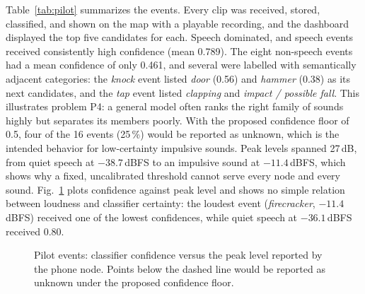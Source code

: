 \documentclass[conference]{IEEEtran}
\newcommand{\dBFS}{\,dBFS}
\begin{document}
Table~\ref{tab:pilot} summarizes the events. Every clip was received, stored, classified, and shown on the map with a playable recording, and the dashboard displayed the top five candidates for each. Speech dominated, and speech events received consistently high confidence (mean 0.789). The eight non-speech events had a mean confidence of only 0.461, and several were labelled with semantically adjacent categories: the \emph{knock} event listed \emph{door} (0.56) and \emph{hammer} (0.38) as its next candidates, and the \emph{tap} event listed \emph{clapping} and \emph{impact / possible fall}. This illustrates problem P4: a general model often ranks the right family of sounds highly but separates its members poorly. With the proposed confidence floor of 0.5, four of the 16 events (25\,\%) would be reported as unknown, which is the intended behavior for low-certainty impulsive sounds. Peak levels spanned 27\,dB, from quiet speech at $-38.7$\dBFS{} to an impulsive sound at $-11.4$\dBFS, which shows why a fixed, uncalibrated threshold cannot serve every node and every sound. Fig.~\ref{fig:pilot} plots confidence against peak level and shows no simple relation between loudness and classifier certainty: the loudest event (\emph{firecracker}, $-11.4$\dBFS) received one of the lowest confidences, while quiet speech at $-36.1$\dBFS{} received 0.80.

\begin{figure}[!t]
\centering
{}
\caption{Pilot events: classifier confidence versus the peak level reported by the phone node. Points below the dashed line would be reported as unknown under the proposed confidence floor.}
\label{fig:pilot}
\end{figure}
\end{document}
